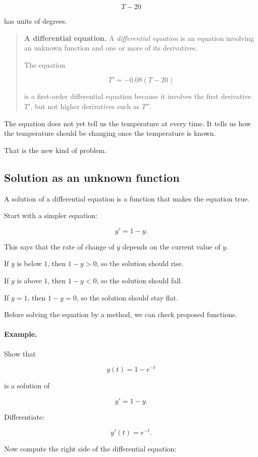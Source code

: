 \[
T-20
\]

has units of degrees.

\begin{quote}
\textbf{A differential equation.}
A \emph{differential equation} is an equation involving an unknown function and one
or more of its derivatives.

The equation

\[
T'=-0.08(T-20)
\]

is a first-order differential equation because it involves the first derivative \(T'\), but
not higher derivatives such as \(T''\).
\end{quote}

The equation does not yet tell us the temperature at every time.  It tells us how the
temperature should be changing once the temperature is known.

That is the new kind of problem.

\subsection{Solution as an unknown function}
\label{subsec:solution-as-unknown-function}

A solution of a differential equation is a function that makes the equation true.

Start with a simpler equation:

\[
y'=1-y.
\]

This says that the rate of change of \(y\) depends on the current value of \(y\).

If \(y\) is below \(1\), then \(1-y>0\), so the solution should rise.

If \(y\) is above \(1\), then \(1-y<0\), so the solution should fall.

If \(y=1\), then \(1-y=0\), so the solution should stay flat.

Before solving the equation by a method, we can check proposed functions.

\paragraph{Example.}
Show that

\[
y(t)=1-e^{-t}
\]

is a solution of

\[
y'=1-y.
\]

Differentiate:

\[
y'(t)=e^{-t}.
\]

Now compute the right side of the differential equation:

